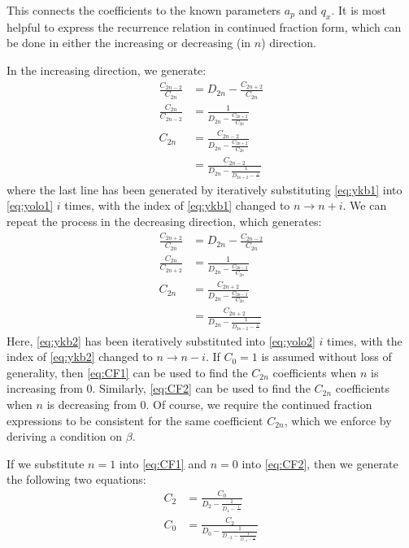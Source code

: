 \documentclass{article}
\begin{document}
This connects the coefficients to the known parameters $a_p$ and $q_x$. It is most helpful to express the recurrence relation in continued fraction form, which can be done in either the increasing or decreasing (in $n$) direction.\par
\medskip
\noindent In the increasing direction, we generate:
\begin{align}
	\frac{C_{2n-2}}{C_{2n}} & = D_{2n} - \frac{C_{2n + 2}}{C_{2n}} \nonumber \\
	\frac{C_{2n}}{C_{2n - 2}} & = \frac{1}{D_{2n} - \frac{C_{2n + 2}}{C_{2n}}} \label{eq:ykb1} \\
	C_{2n} & = \frac{C_{2n - 2}}{D_{2n} - \frac{C_{2n + 2}}{C_{2n}}} \label{eq:yolo1} \\
	& = \frac{C_{2n - 2}}{D_{2n} - \frac{1}{D_{2n+2} - \frac{1}{\dots}}} \label{eq:CF1}
\end{align}
where the last line has been generated by iteratively substituting \eqref{eq:ykb1} into \eqref{eq:yolo1} $i$ times, with the index of \eqref{eq:ykb1} changed to $n \rightarrow n + i$. We can repeat the process in the decreasing direction, which generates:
\begin{align}
\frac{C_{2n + 2}}{C_{2n}} & = D_{2n} - \frac{C_{2n - 2}}{C_{2n}}	 \nonumber \\
\frac{C_{2n}}{C_{2n + 2}} & = \frac{1}{D_{2n} - \frac{C_{2n - 2}}{C_{2n}}} \label{eq:ykb2} \\
C_{2n} & = \frac{C_{2n + 2}}{D_{2n} - \frac{C_{2n - 2}}{C_{2n}}} \label{eq:yolo2} \\
& = \frac{C_{2n + 2}}{D_{2n} - \frac{1}{D_{2n-2} - \frac{1}{\dots}}} \label{eq:CF2}
\end{align}
Here, \eqref{eq:ykb2} has been iteratively substituted into \eqref{eq:yolo2} $i$ times, with the index of \eqref{eq:ykb2} changed to $n \rightarrow n - i$. If $C_{0} = 1$ is assumed without loss of generality, then \eqref{eq:CF1} can be used to find the $C_{2n}$ coefficients when $n$ is increasing from 0. Similarly, \eqref{eq:CF2} can be used to find the $C_{2n}$ coefficients when $n$ is decreasing from 0. Of course, we require the continued fraction expressions to be consistent for the same coefficient $C_{2n}$, which we enforce by deriving a condition on $\beta$. \par
\medskip
\noindent If we substitute $n = 1$ into \eqref{eq:CF1} and $n = 0$ into \eqref{eq:CF2}, then we generate the following two equations:
\begin{align}
C_2 & = \frac{C_0}{D_2 - \frac{1}{D_4 - \frac{1}{\dots}}} \\
C_0 & = \frac{C_2}{D_0 - \frac{1}{D_{-2} - \frac{1}{D_{-4} - \frac{1}{\dots}}}}
\end{align}
\end{document}
